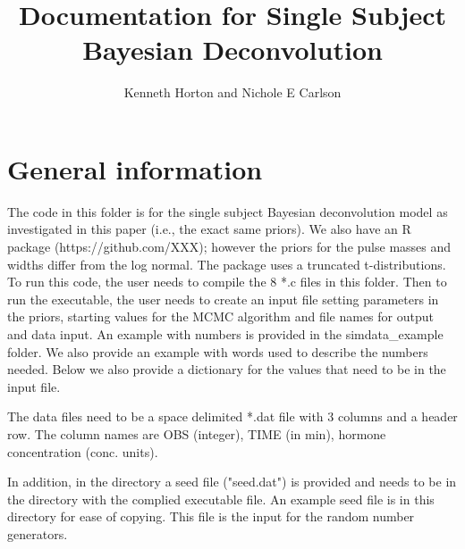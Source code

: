 \documentclass[12pt, oneside]{article}   	%
\begin{document}
\title{Documentation for Single Subject Bayesian Deconvolution}
\author{Kenneth Horton and Nichole E Carlson}
\date{}
\maketitle

\section{General information}
The code in this folder is for the single subject Bayesian deconvolution model as investigated in this paper (i.e., the exact same priors).  We also have an R package (https://github.com/XXX); however the priors for the pulse masses and widths differ from the log normal.  The package uses a truncated t-distributions. To run this code, the user needs to compile the 8 *.c files in this folder. Then to run the executable, the user needs to create an input file setting parameters in the priors, starting values for the MCMC algorithm and file names for output and data input. An example with numbers is provided in the simdata\_example folder. We also provide an example with words used to describe the numbers needed. Below we also provide a dictionary for the values that need to be in the input file.

The data files need to be a space delimited *.dat file with 3 columns and a header row.  The column names are OBS (integer), TIME (in min), hormone concentration (conc. units).


In addition, in the directory a seed file ("seed.dat") is provided and needs to be in the directory with the complied executable file.  An example seed file is in this directory for ease of copying.  This file is the input for the random number generators.
\end{document}
